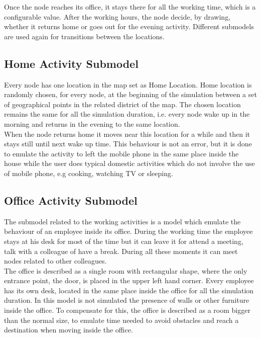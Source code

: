 Once the node reaches its office, it stays there for all the working time, which is a configurable value. After the working hours, the node decide, by drawing, whether it returns home or goes out for the evening activity. Different submodels are used again for transitions between the locations.


\subsection{Home Activity Submodel}
Every node has one location in the map set as Home Location. Home location is randomly chosen, for every node, at the beginning of the simulation between a set of geographical points in the related district of the map. The chosen location remains the same for all the simulation duration, i.e. every node wake up in the morning and returns in the evening to the same location.
\\

When the node returns home it moves near this location for a while and then it stays still until next wake up time. This behaviour is not an error, but it is done to emulate the activity to left the mobile phone in the same place inside the house while the user does typical domestic activities which do not involve the use of mobile phone, e.g cooking, watching TV or sleeping.

\subsection{Office Activity Submodel}
The submodel related to the working activities is a model which emulate the behaviour of an employee inside its office. During the working time the employee stays at his desk for most of the time but it can leave it for attend a meeting, talk with a colleague of have a break. During all these moments it can meet nodes related to other colleagues.
\\

The office is described as a single room with rectangular shape, where the only entrance point, the door, is placed in the upper left hand corner. Every employee has its own desk, located in the same place inside the office for all the simulation duration. In this model is not simulated the presence of walls or other furniture inside the office. To compensate for this, the office is described as a room bigger than the normal size, to emulate time needed to avoid obstacles and reach a destination when moving inside the office.
\\

